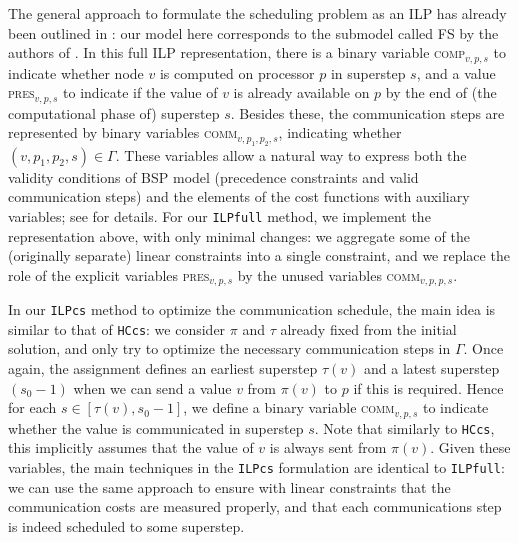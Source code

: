 \documentclass[sigconf,nonacm]{acmart}
\begin{document}
The general approach to formulate the scheduling problem as an ILP has already been outlined in \cite{DAGBSP}: our model here corresponds to the submodel called FS by the authors of \cite{DAGBSP}. In this full ILP representation, there is a binary variable \textsc{comp}$_{v, p, s}$ to indicate whether node $v$ is computed on processor $p$ in superstep $s$, and a value \textsc{pres}$_{v, p, s}$ to indicate if the value of $v$ is already available on $p$ by the end of (the computational phase of) superstep $s$. Besides these, the communication steps are represented by binary variables \textsc{comm}$_{v,p_1,p_2,s}$, indicating whether $(v, p_1, p_2, s) \in \Gamma$. These variables allow a natural way to express both the validity conditions of BSP model (precedence constraints and valid communication steps) and the elements of the cost functions with auxiliary variables; see \cite{DAGBSP} for details. For our \texttt{ILPfull} method, we implement the representation above, with only minimal changes: we aggregate some of the (originally separate) linear constraints into a single constraint, and we replace the role of the explicit variables \textsc{pres}$_{v, p, s}$ by the unused variables \textsc{comm}$_{v,p,p,s}$.

In our \texttt{ILPcs} method to optimize the communication schedule, the main idea is similar to that of \texttt{HCcs}: we consider $\pi$ and $\tau$ already fixed from the initial solution, and only try to optimize the necessary communication steps in $\Gamma$. Once again, the assignment defines an earliest superstep $\tau(v)$ and a latest superstep $(s_0-1)$ when we can send a value $v$ from $\pi(v)$ to $p$ if this is required. Hence for each $s \in [\tau(v), s_0-1]$, we define a binary variable \textsc{comm}$_{v, p, s}$ to indicate whether the value is communicated in superstep $s$. Note that similarly to \texttt{HCcs}, this implicitly assumes that the value of $v$ is always sent from $\pi(v)$. Given these variables, the main techniques in the \texttt{ILPcs} formulation are identical to \texttt{ILPfull}: we can use the same approach to ensure with linear constraints that the communication costs are measured properly, and that each communications step is indeed scheduled to some superstep.
\end{document}
